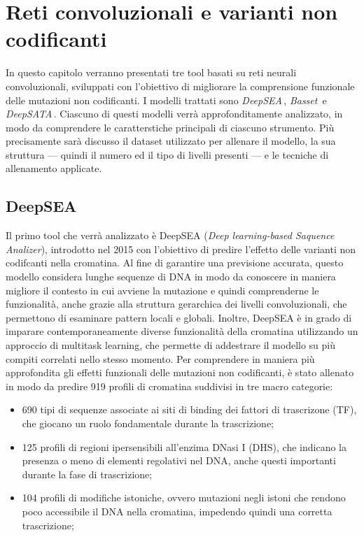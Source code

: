\chapter{Reti convoluzionali e varianti non codificanti}\label{chp:CNN-non-coding-variants}

In questo capitolo verranno presentati tre tool basati su reti neurali convoluzionali, sviluppati con l'obiettivo di migliorare la comprensione funzionale delle mutazioni non codificanti. I modelli trattati sono \textsl{DeepSEA}\,\cite{zhou2015predicting}, \textsl{Basset}\,\cite{kelley2016basset} e \textsl{DeepSATA}\,\cite{ma2023deepsata}. Ciascuno di questi modelli verrà approfonditamente analizzato, in modo da comprendere le caratterstiche principali di ciascuno strumento. Più precisamente sarà discusso il dataset utilizzato per allenare il modello, la sua struttura — quindi il numero ed il tipo di livelli presenti — e le tecniche di allenamento applicate.





\section{DeepSEA}\label{sec:DeepSEA}
% 
Il primo tool che verrà analizzato è DeepSEA (\textit{Deep learning-based Saquence Analizer}), introdotto nel 2015 con l'obiettivo di predire l'effetto delle varianti non codifcanti nella cromatina. Al fine di garantire una previsione accurata, questo modello considera lunghe sequenze di \acs{DNA} in modo da conoscere in maniera migliore il contesto in cui avviene la mutazione e quindi comprenderne le funzionalità, anche grazie alla struttura gerarchica dei livelli convoluzionali, che permettono di esaminare pattern locali e globali. 
Inoltre, DeepSEA è in grado di imparare contemporaneamente diverse funzionalità della cromatina utilizzando un approccio di multitask learning, che permette di addestrare il modello su più compiti correlati nello stesso momento. Per comprendere in maniera più approfondita gli effetti funzionali delle mutazioni non codificanti, è stato allenato in modo da predire 919 profili di cromatina suddivisi in tre macro categorie:
% 
\begin{itemize}
    \item 690 tipi di sequenze associate ai siti di binding dei fattori di trascrizone (\acs{TF}), che giocano un ruolo fondamentale durante la trascrizione;
    \item 125 profili di regioni ipersensibili all'enzima DNasi I (\acs{DHS}), che indicano la presenza o meno di elementi regolativi nel \acs{DNA}, anche questi importanti durante la fase di trascrizione;
    \item 104 profili di modifiche istoniche, ovvero mutazioni negli istoni che rendono poco accessibile il \acs{DNA} nella cromatina, impedendo quindi una corretta trascrizione;
\end{itemize}
% 

